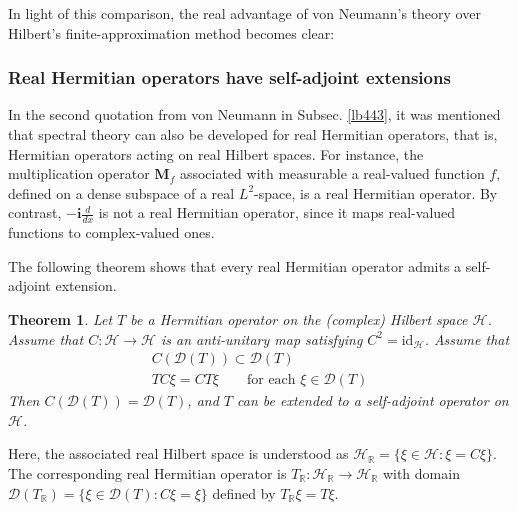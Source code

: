 \documentclass[12pt,b5paper,notitlepage]{article}
\theoremstyle{definition}
\theoremstyle{plain}
\newtheorem{thm}[df]{Theorem}
\newcommand{\wht}{\widehat}
\newcommand{\id}{\mathrm{id}}
\newcommand{\Dom}{\mathscr{D}}
\newcommand{\im}{\mathbf{i}}
\newcommand{\Rbb}{\mathbb R}
\newcommand{\MH}{\mathcal H}
\newcommand{\Mbf}{\mathbf M}
\numberwithin{equation}{section}
\begin{document}

In light of this comparison, the real advantage of von Neumann's theory over Hilbert's finite-approximation method becomes clear: 


\subsubsection{Real Hermitian operators have self-adjoint extensions}

In the second quotation from von Neumann in Subsec. \ref{lb443}, it was mentioned that spectral theory can also be developed for real Hermitian operators, that is, Hermitian operators acting on real Hilbert spaces. For instance, the multiplication operator $\Mbf_f$ associated with measurable a real-valued function $f$, defined on a dense subspace of a real $L^2$-space, is a real Hermitian operator. By contrast, $-\im \frac d{dx}$ is not a real Hermitian operator, since it maps real-valued functions to complex-valued ones.

The following theorem shows that every real Hermitian operator admits a self-adjoint extension.

\begin{thm}\label{lb444}
Let $T$ be a Hermitian operator on the (complex) Hilbert space $\MH$. Assume that $C:\MH\rightarrow\MH$ is an anti-unitary map satisfying $C^2=\id_\MH$. Assume that
\begin{gather*}
C(\Dom(T))\subset\Dom(T)\\
TC\xi=CT\xi\qquad\text{for each }\xi\in\Dom(T)
\end{gather*}
Then $C(\Dom(T))=\Dom(T)$, and $T$ can be extended to a self-adjoint operator on $\MH$.
\end{thm}

Here, the associated real Hilbert space is understood as $\MH_\Rbb=\{\xi\in\MH:\xi=C\xi\}$. The corresponding real Hermitian operator is $T_\Rbb:\MH_\Rbb\rightarrow\MH_\Rbb$ with domain $\Dom(T_\Rbb)=\{\xi\in\Dom(T):C\xi=\xi\}$ defined by $T_\Rbb\xi=T\xi$.
\end{document}
